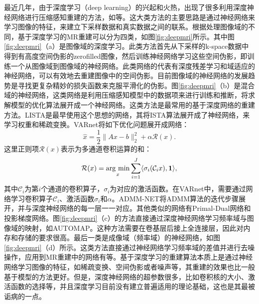 最近几年，由于深度学习\cite{lecun2015deep,schmidhuber2015deep}（deep learning）的兴起和火热，出现了很多利用深度神经网络进行压缩感知重建的方法，如\cite{jin2017deep,admmnet,wang2016accelerating,lee2018deep,han2018deep,zhu2018image,unetcs,varnet,gannet}等。这大类方法的主要思路是通过神经网络来学习图像的特征，来建立下采样数据和真实数据之间的联系。根据处理图像域的不同，基于深度学习的MR重建可以分为四类，如图\ref{fig:deepmri}所示。其中图\ref{fig:deepmri}（a）是图像域的深度学习。此类方法首先从下采样的k-space数据中得到有高度空间伪影的zerofilled图像，然后训练神经网络学习这些空间伪影，即训练一个从图像域到图像域的神经网络。此类网络的代表有深度残差学习\cite{lee2018deep}和域适应的神经网络\cite{han2018deep}，可以有效地去重建图像中的空间伪影。目前图像域的神经网络的发展趋势是寻找更复杂精妙的损失函数来克服平滑化的伪影。图\ref{fig:deepmri}（b）是混合域的神经网络，这类网络是利用压缩感知模型中的数据项来进行训练和推断，将求解模型的优化算法展开成一个神经网络。这类方法是最常用的基于深度网络的重建方法。LISTA\cite{gregor2010learning}是最早使用这个思想的网络，其将ISTA算法\cite{beck2009fast}展开成了神经网络，来学习权重和稀疏变换。VARnet\cite{varnet}将如下优化问题展开成网络：
\begin{equation}
	\hat{x}=\frac{1}{2}\|Ax-b\|_2^2+\alpha\mathcal{R}(x).
\end{equation}
这里正则项$\mathcal{R}(x)$表示为多通道卷积运算的和：
\begin{equation}
	\mathcal{R}(x)=\argmin_x\sum_{i=1}^J\langle \sigma_i(\mathcal{C}_ix),\textbf{1}\rangle,
\end{equation}
其中$\mathcal{C}_i$为第$i$个通道的卷积算子，$\sigma_i$为对应的激活函数。在VARnet中，需要通过网络学习卷积算子$\mathcal{C}_i$、激活函数$\sigma_i$和$\alpha$。ADMM-NET\cite{admmnet}将ADMM算法的迭代步骤展开，并与深度神经网络的每一层一一对应。其他类似的网络有Primal-Dual\cite{adler2018learned}网络和投影梯度\cite{gupta2018cnn}网络。图\ref{fig:deepmri}（c）的方法直接通过深度神经网络学习频率域与图像域的映射，如AUTOMAP\cite{zhu2018image}。这种方法需要在卷基层后接上全连接层，因此对内存和存储的要求很高。最后一类是成像域（频率域）的神经网络，如图\ref{fig:deepmri}（d）所示。这类方法直接通过神经网络学习频率域的差值并进行去噪操作，应用到MR重建中的网络有\cite{han2019k,lee2019k}等。基于深度学习的重建算法本质上是通过神经网络学习图像的特征，如稀疏变换、空间伪影或者噪声等，其重建的效果也比一般基于模型的方法更好。但是，深度神经网络的超参数很多，比如卷积核的大小、激活函数的选择等，并且深度学习目前没有建立普遍适用的理论基础，这也是其最被诟病的一点。
